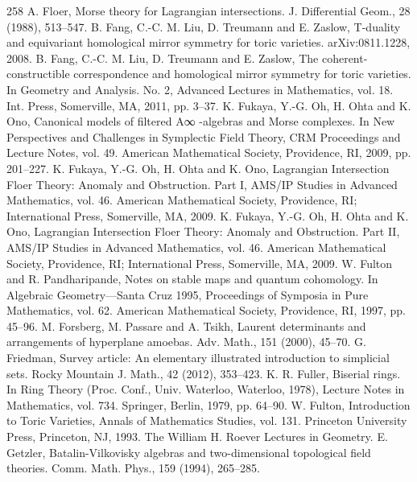 \begin{thebibliography}{258}
\hypertarget{ref:79}{} A. Floer, Morse theory for Lagrangian intersections. J. Differential Geom., 28 (1988), 513–547.
\hypertarget{ref:80}{} B. Fang, C.-C. M. Liu, D. Treumann and E. Zaslow, T-duality and equivariant homological mirror symmetry for toric varieties. arXiv:0811.1228, 2008.
\hypertarget{ref:81}{} B. Fang, C.-C. M. Liu, D. Treumann and E. Zaslow, The coherent-constructible correspondence and homological mirror symmetry for toric varieties. In Geometry and Analysis. No. 2, Advanced Lectures in Mathematics, vol. 18. Int. Press, Somerville, MA, 2011, pp. 3–37.
\hypertarget{ref:82}{} K. Fukaya, Y.-G. Oh, H. Ohta and K. Ono, Canonical models of filtered A∞ -algebras and Morse complexes. In New Perspectives and Challenges in Symplectic Field Theory, CRM Proceedings and Lecture Notes, vol. 49. American Mathematical Society, Providence, RI, 2009, pp. 201–227.
\hypertarget{ref:83}{} K. Fukaya, Y.-G. Oh, H. Ohta and K. Ono, Lagrangian Intersection Floer Theory: Anomaly and Obstruction. Part I, AMS/IP Studies in Advanced Mathematics, vol. 46. American Mathematical Society, Providence, RI; International Press, Somerville, MA, 2009.
\hypertarget{ref:84}{} K. Fukaya, Y.-G. Oh, H. Ohta and K. Ono, Lagrangian Intersection Floer Theory: Anomaly and Obstruction. Part II, AMS/IP Studies in Advanced Mathematics, vol. 46. American Mathematical Society, Providence, RI; International Press, Somerville, MA, 2009.
\hypertarget{ref:85}{} W. Fulton and R. Pandharipande, Notes on stable maps and quantum cohomology. In Algebraic Geometry—Santa Cruz 1995, Proceedings of Symposia in Pure Mathematics, vol. 62. American Mathematical Society, Providence, RI, 1997, pp. 45–96.
\hypertarget{ref:86}{} M. Forsberg, M. Passare and A. Tsikh, Laurent determinants and arrangements of hyperplane amoebas. Adv. Math., 151 (2000), 45–70.
\hypertarget{ref:87}{} G. Friedman, Survey article: An elementary illustrated introduction to simplicial sets. Rocky Mountain J. Math., 42 (2012), 353–423.
\hypertarget{ref:88}{} K. R. Fuller, Biserial rings. In Ring Theory (Proc. Conf., Univ. Waterloo, Waterloo, 1978), Lecture Notes in Mathematics, vol. 734. Springer, Berlin, 1979, pp. 64–90.
\hypertarget{ref:89}{} W. Fulton, Introduction to Toric Varieties, Annals of Mathematics Studies, vol. 131. Princeton University Press, Princeton, NJ, 1993. The William H. Roever Lectures in Geometry.
\hypertarget{ref:90}{} E. Getzler, Batalin-Vilkovisky algebras and two-dimensional topological field theories. Comm. Math. Phys., 159 (1994), 265–285.

\end{thebibliography}
